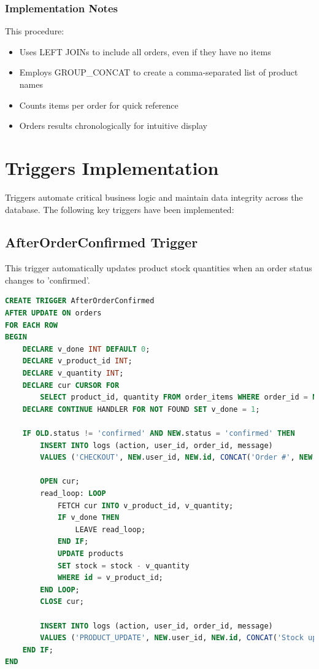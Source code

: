 \documentclass[13pt,a4paper]{article}
\begin{document}
\subsubsection{Implementation Notes}
This procedure:
\begin{itemize}
	\item Uses LEFT JOINs to include all orders, even if they have no items
	\item Employs GROUP\_CONCAT to create a comma-separated list of product names
	\item Counts items per order for quick reference
	\item Orders results chronologically for intuitive display
\end{itemize}

\section{Triggers Implementation}

Triggers automate critical business logic and maintain data integrity across the database. The following key triggers have been implemented:

\subsection{AfterOrderConfirmed Trigger}
This trigger automatically updates product stock quantities when an order status changes to 'confirmed'.

\begin{lstlisting}[language=SQL]
CREATE TRIGGER AfterOrderConfirmed
AFTER UPDATE ON orders
FOR EACH ROW
BEGIN
    DECLARE v_done INT DEFAULT 0;
    DECLARE v_product_id INT;
    DECLARE v_quantity INT;
    DECLARE cur CURSOR FOR 
        SELECT product_id, quantity FROM order_items WHERE order_id = NEW.id;
    DECLARE CONTINUE HANDLER FOR NOT FOUND SET v_done = 1;

    IF OLD.status != 'confirmed' AND NEW.status = 'confirmed' THEN
        INSERT INTO logs (action, user_id, order_id, message)
        VALUES ('CHECKOUT', NEW.user_id, NEW.id, CONCAT('Order #', NEW.id, ' confirmed'));

        OPEN cur;
        read_loop: LOOP
            FETCH cur INTO v_product_id, v_quantity;
            IF v_done THEN
                LEAVE read_loop;
            END IF;
            UPDATE products
            SET stock = stock - v_quantity
            WHERE id = v_product_id;
        END LOOP;
        CLOSE cur;
        
        INSERT INTO logs (action, user_id, order_id, message)
        VALUES ('PRODUCT_UPDATE', NEW.user_id, NEW.id, CONCAT('Stock updated for order #', NEW.id));
    END IF;
END
\end{lstlisting}
\end{document}
